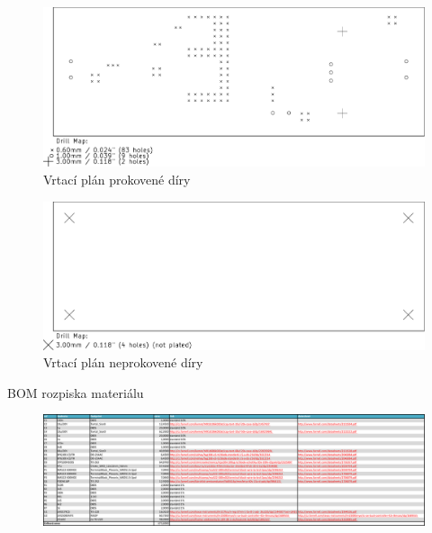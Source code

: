 \begin{figure}[H]
	\centering 	
	\includegraphics[width=17cm]{../design/PDF_out/prokov.pdf}
	\caption{Vrtací plán prokovené díry}	
\end{figure}

\begin{figure}[H]
	\centering 	
	\includegraphics[width=17cm]{../design/PDF_out/prokov_ne.pdf}
	\caption{Vrtací plán neprokovené díry}	
\end{figure}

\begin{table}[H]
	\caption{BOM rozpiska materiálu}
	\begin{figure}[H]
		\centering 	
		\includegraphics[width=17cm]{../BOM.pdf}
	\end{figure}
\end{table}	





